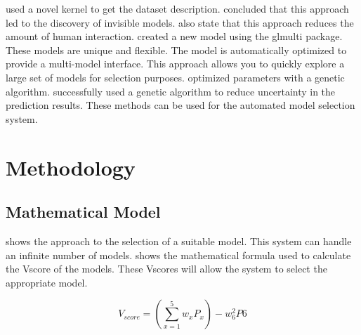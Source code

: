 \documentclass[a4paper,fleqn]{cas-dc}
\begin{document}
\cite*{17_rp} used a novel kernel to get the dataset description. \citeauthor{17_rp} concluded that this approach led to the discovery of invisible models. \citeauthor{17_rp} also state that this approach reduces the amount of human interaction. \cite*{04_rp} created a new model using the glmulti package. These models are unique and flexible. The model is automatically optimized to provide a multi-model interface. This approach allows you to quickly explore a large set of models for selection purposes. \cite*{08_rp} optimized parameters with a genetic algorithm. \citeauthor{08_rp} successfully used a genetic algorithm to reduce uncertainty in the prediction results. These methods can be used for the automated model selection system.

% 
\section{Methodology} \label{sec:methodology}

\subsection{Mathematical Model}\label{subsec:mathematical_model}

 shows the approach to the selection of a suitable model. This system can handle an infinite number of models.  shows the mathematical formula used to calculate the Vscore of the models. These Vscores will allow the system to select the appropriate model.

\begin{equation}\label{eq:v_score}
    V_{score} = \left(\sum_{x=1}^{5} w_xP_x\right) - w_6^2P6
\end{equation}
\end{document}
